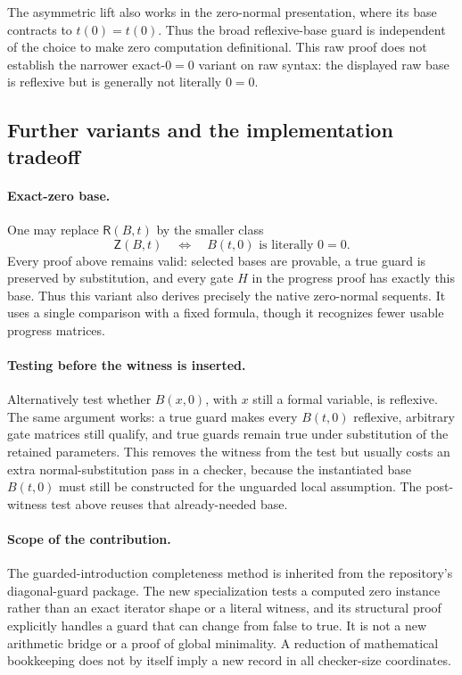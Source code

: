 The asymmetric lift also works in the zero-normal presentation, where
its base contracts to $t(0)=t(0)$.  Thus the broad reflexive-base guard
is independent of the choice to make zero computation definitional.
This raw proof does not establish the narrower exact-$0=0$ variant on
raw syntax: the displayed raw base is reflexive but is generally not
literally $0=0$.

\subsection{Further variants and the implementation tradeoff}

\paragraph{Exact-zero base.}
One may replace $\mathsf R(B,t)$ by the smaller class
\[
 \mathsf Z(B,t)\quad\Longleftrightarrow\quad
 B(t,0)\text{ is literally }0=0.
\]
Every proof above remains valid: selected bases are provable, a true
guard is preserved by substitution, and every gate $H$ in the progress
proof has exactly this base.  Thus this variant also derives precisely
the native zero-normal sequents.  It uses a single comparison with a
fixed formula, though it recognizes fewer usable progress matrices.

\paragraph{Testing before the witness is inserted.}
Alternatively test whether $B(x,0)$, with $x$ still a formal variable,
is reflexive.  The same argument works: a true guard makes every
$B(t,0)$ reflexive, arbitrary gate matrices still qualify, and true
guards remain true under substitution of the retained parameters.
This removes the witness from the test but usually costs an extra
normal-substitution pass in a checker, because the instantiated base
$B(t,0)$ must still be constructed for the unguarded local assumption.
The post-witness test above reuses that already-needed base.

\paragraph{Scope of the contribution.}
The guarded-introduction completeness method is inherited from the
repository's diagonal-guard package.  The new specialization tests a
computed zero instance rather than an exact iterator shape or a literal
witness, and its structural proof explicitly handles a guard that can
change from false to true.  It is not a new arithmetic bridge or a
proof of global minimality.  A reduction of mathematical bookkeeping
does not by itself imply a new record in all checker-size coordinates.

